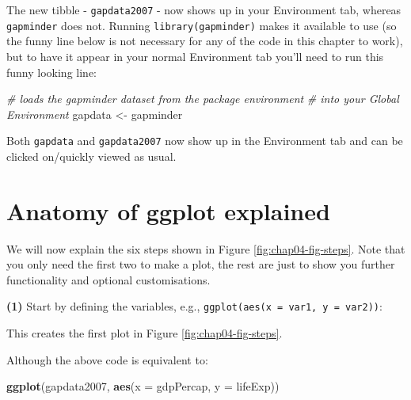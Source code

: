 \documentclass[
  12pt,
  krantz2]{krantz}
\makeatletter
\newenvironment{Shaded}{\begin{snugshade}}{\end{snugshade}}
\newcommand{\CommentTok}[1]{\textcolor[rgb]{0.56,0.35,0.01}{\textit{#1}}}
\newcommand{\DataTypeTok}[1]{\textcolor[rgb]{0.13,0.29,0.53}{#1}}
\newcommand{\KeywordTok}[1]{\textcolor[rgb]{0.13,0.29,0.53}{\textbf{#1}}}
\newcommand{\NormalTok}[1]{#1}
\newcommand{\OperatorTok}[1]{\textcolor[rgb]{0.81,0.36,0.00}{\textbf{#1}}}
\newcommand{\StringTok}[1]{\textcolor[rgb]{0.31,0.60,0.02}{#1}}
\newenvironment{kframe}{%
\medskip{}
\setlength{\fboxsep}{.8em}
 \def\at@end@of@kframe{}%
 \ifinner\ifhmode%
  \def\at@end@of@kframe{\end{minipage}}%
  \begin{minipage}{\columnwidth}%
 \fi\fi%
 \def\FrameCommand##1{\hskip\@totalleftmargin \hskip-\fboxsep
 \colorbox{shadecolor}{##1}\hskip-\fboxsep
     \hskip-\linewidth \hskip-\@totalleftmargin \hskip\columnwidth}%
 \MakeFramed {\advance\hsize-\width
   \@totalleftmargin\z@ \linewidth\hsize
   \@setminipage}}%
 {\par\unskip\endMakeFramed%
 \at@end@of@kframe}
\renewenvironment{Shaded}{\begin{kframe}}{\end{kframe}}
\makeatother
\begin{document}
The new tibble - \texttt{gapdata2007} - now shows up in your Environment tab, whereas \texttt{gapminder} does not.
Running \texttt{library(gapminder)} makes it available to use (so the funny line below is not necessary for any of the code in this chapter to work), but to have it appear in your normal Environment tab you'll need to run this funny looking line:

\begin{Shaded}
\begin{Highlighting}[]
\CommentTok{# loads the gapminder dataset from the package environment}
\CommentTok{# into your Global Environment}
\NormalTok{gapdata <-}\StringTok{ }\NormalTok{gapminder}
\end{Highlighting}
\end{Shaded}

Both \texttt{gapdata} and \texttt{gapdata2007} now show up in the Environment tab and can be clicked on/quickly viewed as usual.

\hypertarget{chap04-gganatomy}{%
\section{Anatomy of ggplot explained}\label{chap04-gganatomy}}


We will now explain the six steps shown in Figure \ref{fig:chap04-fig-steps}.
Note that you only need the first two to make a plot, the rest are just to show you further functionality and optional customisations.

\textbf{(1)} Start by defining the variables, e.g., \texttt{ggplot(aes(x\ =\ var1,\ y\ =\ var2))}:

\begin{Shaded}
\end{Shaded}

This creates the first plot in Figure \ref{fig:chap04-fig-steps}.

Although the above code is equivalent to:

\begin{Shaded}
\begin{Highlighting}[]
\KeywordTok{ggplot}\NormalTok{(gapdata2007, }\KeywordTok{aes}\NormalTok{(}\DataTypeTok{x =}\NormalTok{ gdpPercap, }\DataTypeTok{y =}\NormalTok{ lifeExp))}
\end{Highlighting}
\end{Shaded}
\end{document}

